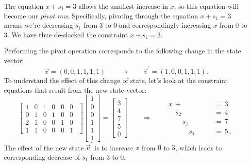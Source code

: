 \documentclass[11pt,oneside]{article}
\begin{document}
		The equation $x + s_1 = 3$ allows the smallest increase in $x$,
		so this equation will become our \emph{pivot row}.
		Specifically, pivoting through the equation $x + s_1 = 3$ means we're decreasing $s_1$ from $3$ to $0$ 
		and correspondingly increasing $x$ from $0$ to $3$.
		We have thue de-slacked the constraint $x + s_1 = 3$.
		
		Performing the pivot operation corresponds to the following change in the state vector:
		\[
		   \vec{v} = (0,0, 1, 1, 1, 1 )
		   \qquad  \to 
		   \qquad 
		   \vec{v}^{\prime} = (1,0, 0, 1, 1, 1 ).
		\]
		To understand the effect of this change of state,
		let's look at the constraint equations that result from the new state vector:
		{\footnotesize
		\[
			\left[
			\begin{array}{rrrrrr}
				    1&     0& 1& 0& 0& 0     \  \   \\ 
				    0&     1& 0& 1& 0& 0     \  \   \\ 
				    2&     1& 0& 0& 1& 0     \  \   \\ 
				    1&     1& 0& 0& 0& 1       \  \ 
			\end{array}
			\right]	
			\!\!
			\begin{bmatrix}
				1 \\ 0 \\  0 \\ 1 \\ 1 \\ 1 
			\end{bmatrix}
			=
			\begin{bmatrix}
				3 \\ 4 \\  7 \\ 5 \\ 0 
			\end{bmatrix}			
			\qquad	
			\Rightarrow
			\qquad
			\begin{array}{rl}
					x \ + \ \ \  \quad \quad \quad	\ &=	\ 3	\\
					\quad s_2 \quad \quad 		\ &= 	\ 4	\\
					\quad \quad  s_3 \quad 		\ &= 	\ 7	\\
					 \quad \quad \quad  s_4   		\ &= 	\ 5 \ .
			\end{array}
		\]}%
		The effect of the new state $\vec{v}^\prime$ is to increase $x$ from $0$ to $3$,
		which leads to corresponding decrease of $s_1$ from $3$ to $0$.
\end{document}
